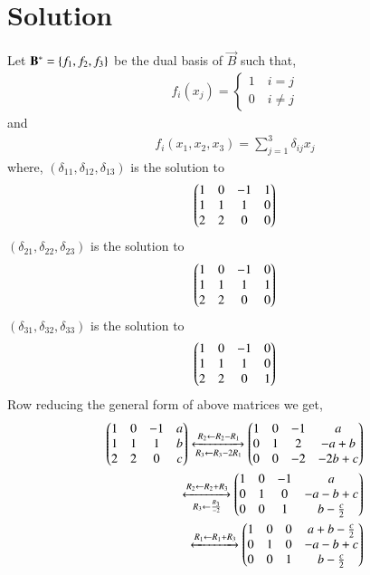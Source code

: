 \documentclass[journal,12pt,twocolumn]{IEEEtran}
\begin{document}
\section{Solution}
Let $\mathbf{B}^* = \left\{f_1, f_2, f_3\right\}$ be the dual basis of $\vec{B}$ such that,
\begin{align}
	f_i(x_j) = \begin{cases}
		1 \quad i = j\\
		0 \quad i \not= j
	\end{cases}
\end{align}
and 
\begin{align}
	f_i(x_1, x_2, x_3) = \sum_{j=1}^{3} \delta_{ij}x_j \label{eq:eq1}
\end{align}
where, $(\delta_{11}, \delta_{12}, \delta_{13} )$ is the solution to 
\begin{align}
	\begin{pmatrix}1 & 0 & -1 & 1\\ 1 & 1 & 1 & 0\\ 2 & 2 & 0 & 0\end{pmatrix}
\end{align}
$(\delta_{21}, \delta_{22}, \delta_{23} )$ is the solution to 
\begin{align}
	\begin{pmatrix}1 & 0 & -1 & 0\\ 1 & 1 & 1 & 1\\ 2 & 2 & 0 & 0\end{pmatrix}
\end{align}
$(\delta_{31}, \delta_{32}, \delta_{33} )$ is the solution to 
\begin{align}
	\begin{pmatrix}1 & 0 & -1 & 0\\ 1 & 1 & 1 & 0\\ 2 & 2 & 0 & 1\end{pmatrix}
\end{align}
Row reducing the general form of above matrices we get,
\begin{align}
	\begin{pmatrix}1 & 0 & -1 & a\\ 1 & 1 & 1 & b\\ 2 & 2 & 0 & c\end{pmatrix}
	\xleftrightarrow[R_3 \leftarrow R_3 - 2R_1]{R_2 \leftarrow R_2 - R_1}
	\begin{pmatrix}1 & 0 & -1 & a\\ 0 & 1 & 2 & -a + b\\ 0 & 0 & -2 & -2b + c\end{pmatrix}\\
	\xleftrightarrow[R_3 \leftarrow \frac{R_3}{-2}]{R_2 \leftarrow R_2 + R_3}
	\begin{pmatrix}1 & 0 & -1 & a\\ 0 & 1 & 0 & -a - b + c\\ 0 & 0 & 1 & b - \frac{c}{2}\end{pmatrix}\\
	\xleftrightarrow{R_1 \leftarrow R_1 + R_3}
	\begin{pmatrix}1 & 0 & 0 & a + b - \frac{c}{2} \\ 0 & 1 & 0 & -a - b + c\\ 0 & 0 & 1 & b - \frac{c}{2}\end{pmatrix}	
\end{align}
\end{document}

